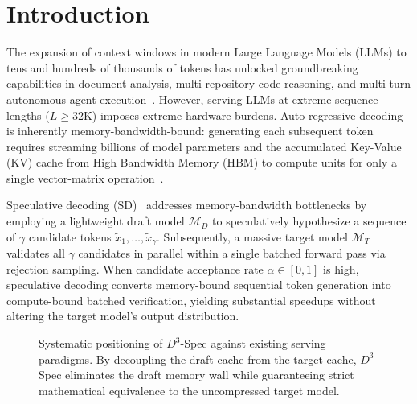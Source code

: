 \documentclass[runningheads]{llncs}
\begin{document}
\section{Introduction}
\label{sec:intro}

The expansion of context windows in modern Large Language Models (LLMs) to tens and hundreds of thousands of tokens has unlocked groundbreaking capabilities in document analysis, multi-repository code reasoning, and multi-turn autonomous agent execution~\cite{achiam2023gpt,dubey2024llama3,bai2023longbench}. However, serving LLMs at extreme sequence lengths ($L \ge 32\text{K}$) imposes extreme hardware burdens. Auto-regressive decoding is inherently memory-bandwidth-bound: generating each subsequent token requires streaming billions of model parameters and the accumulated Key-Value (KV) cache from High Bandwidth Memory (HBM) to compute units for only a single vector-matrix operation~\cite{shazeer2019fast,kwon2023vllm}.

Speculative decoding (SD)~\cite{leviathan2023fast,chen2023accelerating} addresses memory-bandwidth bottlenecks by employing a lightweight draft model $\mathcal{M}_D$ to speculatively hypothesize a sequence of $\gamma$ candidate tokens $\tilde{x}_1, \dots, \tilde{x}_\gamma$. Subsequently, a massive target model $\mathcal{M}_T$ validates all $\gamma$ candidates in parallel within a single batched forward pass via rejection sampling. When candidate acceptance rate $\alpha \in [0, 1]$ is high, speculative decoding converts memory-bound sequential token generation into compute-bound batched verification, yielding substantial speedups without altering the target model's output distribution.

\begin{figure}[t]
\centering
{}
\caption{Systematic positioning of $D^3$-Spec against existing serving paradigms. By decoupling the draft cache from the target cache, $D^3$-Spec eliminates the draft memory wall while guaranteeing strict mathematical equivalence to the uncompressed target model.}
\label{fig:paradigm_comparison}
\end{figure}
\end{document}
